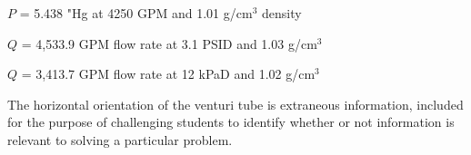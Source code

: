 \vskip 10pt

$P$ = 5.438 "Hg at 4250 GPM and 1.01 g/cm$^{3}$ density

\vskip 10pt

$Q$ = 4,533.9 GPM flow rate at 3.1 PSID and 1.03 g/cm$^{3}$

\vskip 10pt

$Q$ = 3,413.7 GPM flow rate at 12 kPaD and 1.02 g/cm$^{3}$

\vskip 10pt

The horizontal orientation of the venturi tube is extraneous information, included for the purpose of challenging students to identify whether or not information is relevant to solving a particular problem.




